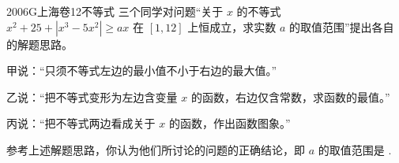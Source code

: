 
\begin{problem}{2006}{G}{上海卷}{12}{不等式}
三个同学对问题“关于 $ x $ 的不等式 $ x^2 + 25 + |x^3 - 5x^2| \ge ax $ 在 $ [1, 12] $ 上恒成立，求实数 $ a $ 的取值范围”提出各自的解题思路。

甲说：“只须不等式左边的最小值不小于右边的最大值。”

乙说：“把不等式变形为左边含变量 $ x $ 的函数，右边仅含常数，求函数的最值。”

丙说：“把不等式两边看成关于 $ x $ 的函数，作出函数图象。”

参考上述解题思路，你认为他们所讨论的问题的正确结论，即 $ a $ 的取值范围是 \underline{\hspace{4em}}.
\end{problem}

\begin{answer}

\end{answer}

\begin{solutions}

\end{solutions}